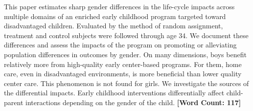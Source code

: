 \noindent This paper estimates sharp gender differences in the life-cycle impacts across multiple domains of an enriched early childhood program targeted toward disadvantaged children. Evaluated by the method of random assignment, treatment and control subjects were followed through age 34. We document these differences and assess the impacts of the program on promoting or alleviating population differences in outcomes by gender. On many dimensions, boys benefit relatively more from high-quality early center-based programs. For them, home care, even in disadvantaged environments, is more beneficial than lower quality center care. This phenomenon is not found for girls. We investigate the sources of the differential impacts. Early childhood interventions differentially affect child-parent interactions depending on the gender of the child. \textbf{[Word Count: 117]}